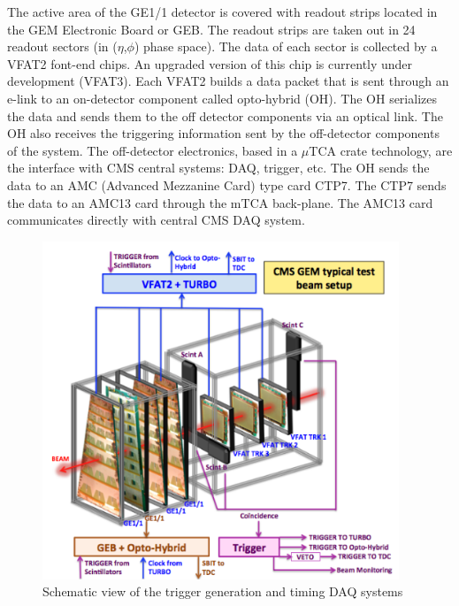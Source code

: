 The active area of the GE1/1 detector is covered with readout strips located in the GEM Electronic Board or GEB. The readout strips are taken out in 24 readout sectors (in ($\eta$,$\phi$) phase space). The data of each sector is collected by a VFAT2 font-end chips. An upgraded version of this chip is currently under development (VFAT3). Each VFAT2 builds a data packet that is sent through an e-link to an on-detector component called opto-hybrid (OH). The OH serializes the data and sends them to the off detector components via an optical link. The OH also receives the triggering information sent by the off-detector components of the system. The off-detector electronics, based in a $\mu$TCA crate technology, are the interface with CMS central systems: DAQ, trigger, etc. The OH sends the data to an AMC (Advanced Mezzanine Card) type card CTP7. The CTP7 sends the data to an AMC13 card through the mTCA back-plane. The AMC13 card communicates directly with central CMS DAQ system.

\begin{figure}[!htbp]
\centering
\includegraphics[width=0.95\textwidth]{figures/GEM/tb_exptsetup.png}
\caption{Schematic view of the trigger generation and timing DAQ systems}\label{fig:daq}
\end{figure}


